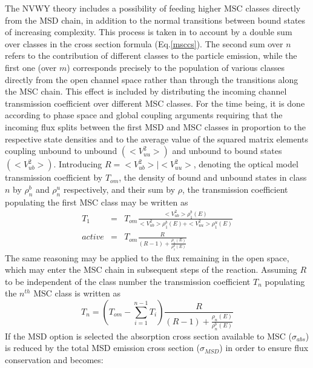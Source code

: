 The NVWY%
 theory includes a possibility of feeding higher MSC classes
directly from the MSD%
 chain, in addition to the normal transitions between bound
states of increasing complexity. This process is taken in to account by a
double sum over classes in the cross section formula (Eq.\ref{msccs}). The
second sum over $n$ refers to the contribution of different classes to the
particle emission, while the first one (over $m$) corresponds precisely to
the population of various classes directly from the open channel space
rather than through the transitions along the MSC chain. This effect is
included
by distributing the incoming channel transmission coefficient over different
MSC%
 classes. For the time being, it is done according to phase space
and global coupling arguments requiring that the incoming flux splits
between the first MSD%
 and MSC classes in proportion to the respective state densities
and to the average value of the squared matrix elements coupling unbound to
unbound $(<V_{uu}^{2}>)$ and unbound to bound states $(<V_{ub}^{2}>)$.
Introducing $R=<V_{ub}^{2}>\mid<V_{uu}^{2}>$, denoting the optical model
transmission coefficient by $T_{om}$, the density of bound and unbound
states in class $n$ by $\rho_{n}^{b}$ and $\rho_{n}^{u}$ respectively, and
their sum by $\rho$, the transmission coefficient populating the first MSC%
 class may be written as
\begin{eqnarray}
T_{1}&=&T_{om}%
\frac{<V_{ub}^{2}>\rho_{1}^{b}(E)}{<V_{ub}^{2}>\rho_{1}^{b}(E)+<V_{uu}^{2}>%
\rho_{1}^{u}(E)}  \nonumber \\
active &=&T_{om}\frac{R}{(R-1)+\frac{\rho_{1}(E)}{\rho_{1}^{b}(E)}}
\label{eq9}
\end{eqnarray}
The same reasoning may be applied to the flux remaining in the open space,
which may enter the MSC%
 chain in subsequent steps of the reaction. Assuming $R$ to be
independent of the class number the transmission coefficient $T_{n}$
populating the $n^{th}$ MSC class is written as
\begin{equation}
T_{n}=\left(T_{om}-\sum_{i=1}^{n-1}T_{i}\right)%
\frac{R}{(R-1)+\frac{\rho_{n}(E)}{\rho_{n}^{b}(E)}}  \label{eq10}
\end{equation}
If the MSD%
 option is selected the absorption cross section available to MSC
($\sigma_{abs}$) is reduced by the total MSD emission cross section ($%
\sigma_{MSD}$) in order to ensure flux conservation and becomes:
